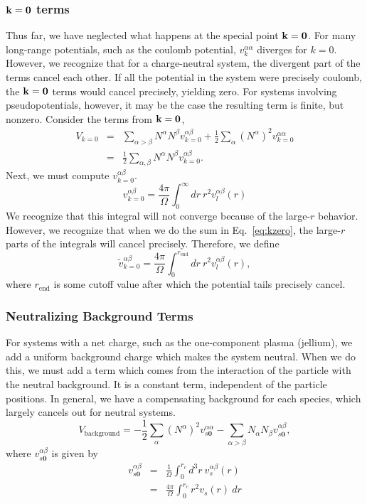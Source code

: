 \subsubsection{$\mathbf{k}=\mathbf{0}$ terms}
Thus far, we have neglected what happens at the special point $\mathbf{k} =
\mathbf{0}$.  For many long-range potentials, such as the coulomb
potential, $v_k^{\alpha \alpha}$ diverges for $k=0$.  However, we
recognize that for a charge-neutral system, the divergent part of the
terms cancel each other.  If all the potential in the system were
precisely coulomb, the $\mathbf{k}=\mathbf{0}$ terms would cancel precisely,
yielding zero.  For systems involving pseudopotentials, however, it
may be the case the resulting term is finite, but nonzero.  Consider
the terms from $\mathbf{k}=\mathbf{0}$,
\begin{eqnarray}
V_{k=0} & = & \sum_{\alpha>\beta} N^\alpha N^\beta v^{\alpha \beta}_{k=0}
+ \frac{1}{2} \sum_\alpha \left(N^{\alpha}\right)^2 v^{\alpha\alpha}_{k=0} \\
& = & \frac{1}{2} \sum_{\alpha,\beta} N^\alpha N^\beta v^{\alpha
  \beta}_{k=0}.
\label{eq:kzero}
\end{eqnarray}
Next, we must compute $v^{\alpha \beta}_{k=0}$.  
\begin{equation}
v^{\alpha \beta}_{k=0} = \frac{4 \pi}{\Omega} \int_0^\infty dr\ r^2
v_l^{\alpha \beta}(r)
\end{equation}
We recognize that this integral will not converge because of the
large-$r$ behavior.  However, we recognize that when we do the sum in
Eq.~\ref{eq:kzero}, the large-$r$ parts of the integrals will cancel
precisely.  Therefore, we define
\begin{equation}
\tilde{v}^{\alpha \beta}_{k=0} = \frac{4 \pi}{\Omega} 
\int_0^{r_\text{end}} dr\ r^2 v_l^{\alpha \beta}(r),
\end{equation}
where $r_{\text{end}}$ is some cutoff value after which the potential
tails precisely cancel.

\subsubsection{Neutralizing Background Terms}
For systems with a net charge, such as the one-component plasma
(jellium), we add a uniform background charge which makes the system
neutral.  When we do this, we must add a term which comes from the
interaction of the particle with the neutral background.  It is a
constant term, independent of the particle positions.  In general, we
have a compensating background for each species, which largely cancels
out for neutral systems.
\begin{equation}
V_\text{background} = -\frac{1}{2} \sum_\alpha \left(N^\alpha\right)^2 
v^{\alpha \alpha}_{s\mathbf{0}}
-\sum_{\alpha > \beta} N_\alpha N_\beta
v^{\alpha\beta}_{s\mathbf{0}},
\end{equation}
where $v^{\alpha \beta}_{s\mathbf{0}}$ is given by
\begin{eqnarray}
v^{\alpha \beta}_{s\mathbf{0}} & = & \frac{1}{\Omega} \int_0^{r_c} d^3 r\ 
v^{\alpha \beta}_s(r) \\
& = & \frac{4 \pi}{\Omega} \int_0^{r_c} r^2 v_s(r) \ dr \nonumber
\end{eqnarray}


